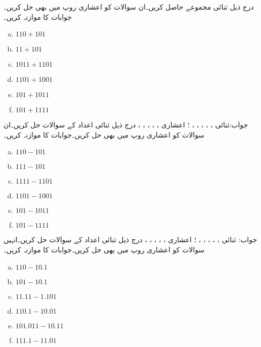 درج ذیل ثنائی مجموعے حاصل کریں۔ان سوالات کو اعشاری روپ میں بھی حل کریں۔جوابات کا موازنہ کریں۔
\begin{multicols}{4}
\begin{enumerate}[a.]

\item  
 \(110+101\)  
\item 
 \(11+101\) 

\item  
 \(1011+1101\)  
\item 
 \(1101+1001\)   

\item  
 \(101+1011\)  
\item 
 \(101+1111\)  
\end{enumerate}
\end{multicols}
جواب:ثنائی ، ، ، ، ، ؛ 
اعشاری   ، ، ، ، ، 
درج ذیل ثنائی اعداد کے سوالات حل کریں۔ان سوالات کو اعشاری روپ میں بھی حل کریں۔جوابات کا موازنہ کریں۔
\begin{multicols}{4}
\begin{enumerate}[a.]

\item  
 \(110-101\)  
\item 
 \(111-101\) 

\item  
 \(1111-1101\)  
\item 
 \(1101-1001\)   

\item  
 \(101-1011\)  
\item 
 \(101-1111\)
\end{enumerate}
\end{multicols}
جواب: ثنائی  ، ، ،  ، ، ؛
 اعشاری  ، ، ، ،  ، 
درج ذیل ثنائی اعداد کے سوالات حل کریں۔انہیں سوالات کو اعشاری روپ میں بھی حل کریں۔جوابات کا موازنہ کریں۔
\begin{multicols}{4}
\begin{enumerate}[a.]
\item  
 \(110-10.1\)  
\item 
 \(101-10.1\) 

\item  
 \(11.11-1.101\)  
\item 
 \(110.1-10.01\)   

\item  
 \(101.011-10.11\) 
\item 
 \(111.1-11.01\)
\end{enumerate}
\end{multicols}
